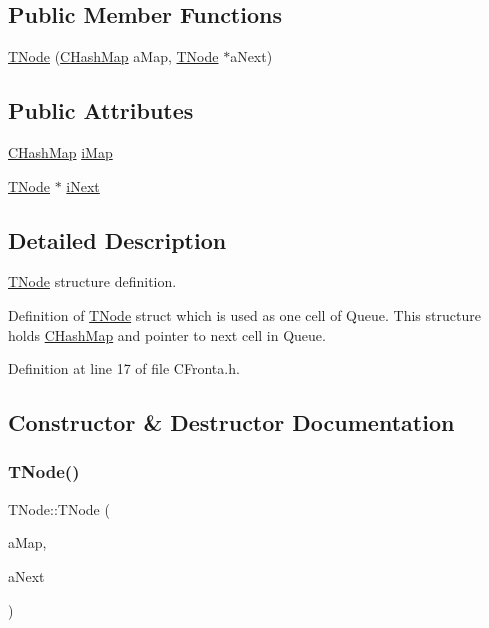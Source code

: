 \subsection*{Public Member Functions}
\begin{DoxyCompactItemize}
\item 
\hyperlink{struct_t_node_a1abf7a155382212f47f46ff93d94c6ca}{T\+Node} (\hyperlink{class_c_hash_map}{C\+Hash\+Map} a\+Map, \hyperlink{struct_t_node}{T\+Node} $\ast$a\+Next)
\end{DoxyCompactItemize}
\subsection*{Public Attributes}
\begin{DoxyCompactItemize}
\item 
\hyperlink{class_c_hash_map}{C\+Hash\+Map} \hyperlink{struct_t_node_a012479fdf8dd85030f4ec37cf68cd30d}{i\+Map}
\item 
\hyperlink{struct_t_node}{T\+Node} $\ast$ \hyperlink{struct_t_node_af9887827de1e76bde1de70d9cf42eb2e}{i\+Next}
\end{DoxyCompactItemize}


\subsection{Detailed Description}
\hyperlink{struct_t_node}{T\+Node} structure definition. 

Definition of \hyperlink{struct_t_node}{T\+Node} struct which is used as one cell of Queue. This structure holds \hyperlink{class_c_hash_map}{C\+Hash\+Map} and pointer to next cell in Queue. 

Definition at line 17 of file C\+Fronta.\+h.



\subsection{Constructor \& Destructor Documentation}
\mbox{\label{struct_t_node_a1abf7a155382212f47f46ff93d94c6ca}} 
\subsubsection{\texorpdfstring{T\+Node()}{TNode()}}
{\footnotesize\ttfamily T\+Node\+::\+T\+Node (\begin{DoxyParamCaption}\item[{\hyperlink{class_c_hash_map}{C\+Hash\+Map}}]{a\+Map,  }\item[{\hyperlink{struct_t_node}{T\+Node} $\ast$}]{a\+Next }\end{DoxyParamCaption})\hspace{0.3cm}{\ttfamily [inline]}}



